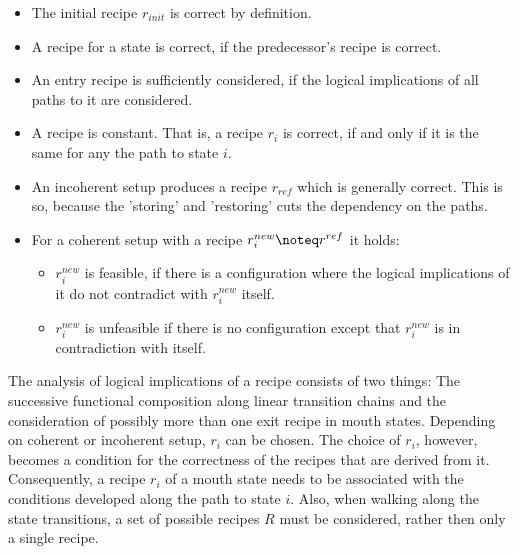 \documentclass[12pt,a4paper]{scrartcl}
\begin{document}
\begin{itemize}
    \item The initial recipe $r_{init}$ is correct by definition.

    \item A recipe for a state is correct, if the predecessor's recipe is correct.

    \item An entry recipe is sufficiently considered, if the logical
        implications of all paths to it are considered.

    \item A recipe is constant. That is, a recipe $r_i$ is correct, if and only
        if it is the same for any the path to state $i$.

    \item An incoherent setup produces a recipe $r_{ref}$ which is generally
        correct.  This is so, because the 'storing' and 'restoring' cuts the
        dependency on the paths.

    \item For a coherent setup with a recipe $r^{new}_i\noteq r^{ref}$ it holds:

        \begin{itemize}

            \item $r^{new}_i$ is feasible, if there is a configuration where
                the logical implications of it do not contradict with
                $r^{new}_i$ itself.

            \item $r^{new}_i$ is unfeasible if there is no configuration
                except that $r^{new}_i$ is in contradiction with itself.

        \end{itemize}

\end{itemize}

The analysis of logical implications of a recipe consists of two things: The
successive functional composition along linear transition chains and the
consideration of possibly more than one exit recipe in mouth states. Depending
on coherent or incoherent setup, $r_i$ can be chosen.  The choice of $r_i$,
however, becomes a condition for the correctness of the recipes that are
derived from it.  Consequently, a recipe $r_i$ of a mouth state needs to be
associated with the conditions developed along the path to state $i$. Also,
when walking along the state transitions, a set of possible recipes $R$ must be
considered, rather then only a single recipe.
\end{document}
